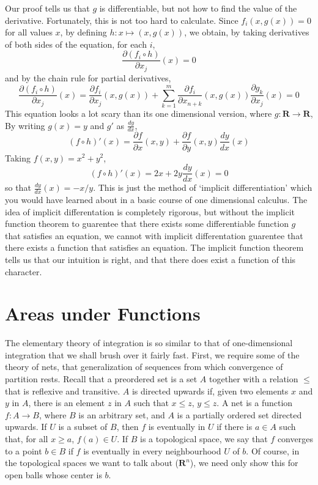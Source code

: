 Our proof tells us that $g$ is differentiable, but not how to find the value of the derivative. Fortunately, this is not too hard to calculate. Since $f_i(x,g(x)) = 0$ for all values $x$, by defining $h: x \mapsto (x,g(x))$, we obtain, by taking derivatives of both sides of the equation, for each $i$,
%
\[ \frac{\partial (f_i \circ h)}{\partial x_j} (x) = 0 \]
%
and by the chain rule for partial derivatives,
%
\[ \frac{\partial (f_i \circ h)}{\partial x_j} (x) = \frac{\partial f_i}{\partial x_j}(x,g(x)) + \sum_{k = 1}^{m} \frac{\partial f_i}{\partial x_{n + k}}(x,g(x)) \frac{\partial g_k}{\partial x_j} (x) = 0 \]
%
This equation looks a lot scary than its one dimensional version, where $g: \mathbf{R} \to \mathbf{R}$, By writing $g(x) = y$ and $g'$ as $\frac{dy}{dx}$,
%
\[ (f \circ h)'(x) = \frac{\partial f}{\partial x}(x,y) + \frac{\partial f}{\partial y}(x,y) \frac{dy}{dx}(x) \]
%
Taking $f(x,y) = x^2 + y^2$,
%
\[ (f \circ h)'(x) = 2x + 2y \frac{dy}{dx}(x) = 0 \]
%
so that $\frac{dy}{dx}(x) = -x/y$. This is just the method of `implicit differentiation' which you would have learned about in a basic course of one dimensional calculus. The idea of implicit differentation is completely rigorous, but without the implicit function theorem to guarentee that there exists some differentiable function $g$ that satisfies an equation, we cannot with implicit differentation guarentee that there exists a function that satisfies an equation. The implicit function theorem tells us that our intuition is right, and that there does exist a function of this character.





\chapter{Areas under Functions}

The elementary theory of integration is so similar to that of one-dimensional integration that we shall brush over it fairly fast. First, we require some of the theory of nets, that generalization of sequences from which convergence of partition rests. Recall that a preordered set is a set $A$ together with a relation $\leq$ that is reflexive and transitive. $A$ is directed upwards if, given two elements $x$ and $y$ in $A$, there is an element $z$ in $A$ such that $x \leq z$, $y \leq z$. A net is a function $f:A \to B$, where $B$ is an arbitrary set, and $A$ is a partially ordered set directed upwards. If $U$ is a subset of $B$, then $f$ is eventually in $U$ if there is $a \in A$ such that, for all $x \geq a$, $f(a) \in U$. If $B$ is a topological space, we say that $f$ converges to a point $b \in B$ if $f$ is eventually in every neighbourhood $U$ of $b$. Of course, in the topological spaces we want to talk about ($\mathbf{R}^n$), we need only show this for open balls whose center is $b$.

